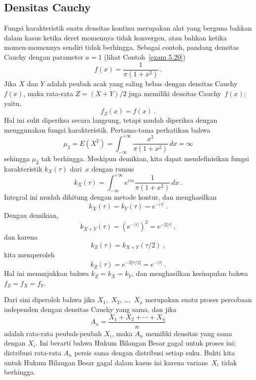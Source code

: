 \subsection*{Densitas Cauchy}
Fungsi karakteristik suatu densitas kontinu merupakan alat yang berguna bahkan dalam
kasus ketika deret momennya tidak konvergen, atau bahkan ketika
momen-momennya sendiri tidak berhingga.  Sebagai contoh, pandang densitas Cauchy
dengan parameter $a = 1$ (lihat Contoh~\ref{exam 5.20})
$$
f(x) = \frac1{\pi(1 + x^2)}\ .
$$
Jika $X$ dan $Y$ adalah peubah acak yang saling bebas dengan densitas Cauchy~$f(x)$,
maka rata-rata $Z = (X + Y)/2$ juga memiliki densitas Cauchy~$f(x)$; yaitu,
$$
f_Z(x) = f(x)\ .
$$
Hal ini sulit diperiksa secara langsung, tetapi mudah diperiksa dengan menggunakan fungsi
karakteristik.  Pertama-tama perhatikan bahwa
$$
\mu_2 = E(X^2) = \int_{-\infty}^{+\infty} \frac{x^2}{\pi(1 + x^2)}\, dx = \infty
$$
sehingga $\mu_2$ tak berhingga.  Meskipun demikian, kita dapat mendefinisikan fungsi
karakteristik $k_X(\tau)$ dari~$x$ dengan rumus
$$
k_X(\tau) = \int_{-\infty}^{+\infty} e^{i\tau x}\frac1{\pi(1 + x^2)}\, dx\ .
$$
Integral ini mudah dihitung dengan metode kontur, dan menghasilkan
$$
k_X(\tau) = k_Y(\tau) = e^{-|\tau|}\ .
$$
Dengan demikian,
$$
k_{X + Y}(\tau) = (e^{-|\tau|})^2 = e^{-2|\tau|}\ ,
$$
dan karena
$$
k_Z(\tau) = k_{X + Y}(\tau/2)\ ,
$$
kita memperoleh
$$
k_Z(\tau) = e^{-2|\tau/2|} = e^{-|\tau|}\ .
$$
Hal ini menunjukkan bahwa $k_Z = k_X = k_Y$, dan menghasilkan kesimpulan bahwa $f_Z = f_X
= f_Y$.

Dari sini diperoleh bahwa jika $X_1$,~$X_2$, \ldots,~$X_n$ merupakan suatu proses
percobaan independen dengan densitas Cauchy yang sama, dan jika
$$
A_n = \frac{X_1 + X_2 + \cdots+ X_n}n
$$
adalah rata-rata peubah-peubah $X_i$, maka $A_n$ memiliki densitas yang sama dengan $X_i$. 
Ini berarti bahwa Hukum Bilangan Besar gagal untuk proses ini; distribusi
rata-rata $A_n$ persis sama dengan distribusi setiap suku.
Bukti kita untuk Hukum Bilangan Besar gagal dalam kasus ini karena varians~$X_i$
tidak berhingga.

